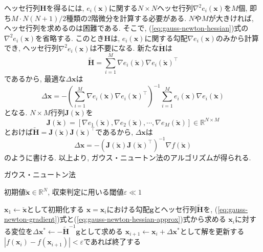\documentclass[dvipdfmx,a4paper]{jsarticle}
\begin{document}
ヘッセ行列$\bm{H}$を得るには, $e_i(\bm{x})$に関する$N \times N$ヘッセ行列$\nabla^2 e_i(\bm{x})$を$M$個, 即ち$M \cdot N(N + 1)/2$種類の2階微分を計算する必要がある.
$N$や$M$が大きければ, ヘッセ行列を求めるのは困難である.
そこで, (\ref{eq:gauss-newton-hessian})式の$\nabla^2 e_i(\bm{x})$を省略する.
このとき$\bm{H}$は, $e_i(\bm{x})$に関する勾配$\nabla e_i(\bm{x})$のみから計算でき, ヘッセ行列$\nabla^2 e_i(\bm{x})$は不要になる.
新たな$\tilde{\bm{H}}$は
\begin{equation}
    \tilde{\bm{H}} = \sum_{i = 1}^M \nabla e_i(\breve{\bm{x}}) \nabla e_i(\breve{\bm{x}})^\top
    \label{eq:gauss-newton-hessian-approx}
\end{equation}
であるから, 最適な$\Delta \bm{x}$は
\begin{equation}
    \Delta \bm{x} = -\left( \sum_{i = 1}^M \nabla e_i(\breve{\bm{x}})
    \nabla e_i(\breve{\bm{x}})^\top \right)^{-1}
    \sum_{i = 1}^M e_i(\bm{x}) \nabla e_i(\breve{\bm{x}})
    \label{eq:gauss-newton-update}
\end{equation}
となる. $N \times M$行列$\bm{J}(\breve{\bm{x}})$を
\begin{equation}
    \bm{J}(\breve{\bm{x}}) = \left[
    \nabla e_1(\breve{\bm{x}}), \nabla e_2(\breve{\bm{x}}), \cdots,
    \nabla e_M(\breve{\bm{x}}) \right] \in \mathbb{R}^{N \times M}
\end{equation}
とおけば$\tilde{\bm{H}} = \bm{J}(\breve{\bm{x}}) \bm{J}(\breve{\bm{x}})^\top$であるから, $\Delta \bm{x}$は
\begin{equation}
    \Delta \bm{x} = -\left( \bm{J}(\breve{\bm{x}}) \bm{J}(\breve{\bm{x}})^\top \right)^{-1}
    \nabla f(\breve{\bm{x}})
\end{equation}
のように書ける. 以上より, ガウス・ニュートン法のアルゴリズムが得られる.

\begin{algorithm}[H]
    \caption{ガウス・ニュートン法}
    \label{alg:gauss-newton}
    \begin{algorithmic}[1]
        \Require 初期値$\breve{\bm{x}} \in \mathbb{R}^N$, 収束判定に用いる閾値$\varepsilon \ll 1$

        \State $\bm{x}_1 \gets \breve{\bm{x}}$として初期化する
            \State $\bm{x} = \bm{x}_i$における勾配$\bm{g}$とヘッセ行列$\tilde{\bm{H}}$を, (\ref{eq:gauss-newton-gradient})式と(\ref{eq:gauss-newton-hessian-approx})式から求める
            \State $\bm{x}_i$に対する変位を$\Delta \bm{x}^* \gets -\tilde{\bm{H}}^{-1} \bm{g}$として求める
            \State $\bm{x}_{i + 1} \gets \bm{x}_i + \Delta \bm{x}^*$として解を更新する
            \State $\left| f(\bm{x}_i) - f(\bm{x}_{i + 1}) \right| < \varepsilon$であれば終了する
        \EndFor
    \end{algorithmic}
\end{algorithm}
\end{document}
